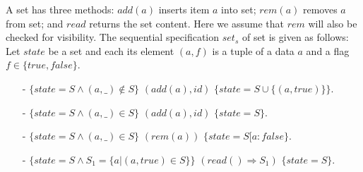 \begin{example}
\label{definition:sequential specification of set}
A set has three methods: $\mathit{add}(a)$ inserts item $a$ into set; $\mathit{rem}(a)$ removes $a$ from set; and $\mathit{read}$ returns the set content. %
Here we assume that $\mathit{rem}$ will also be checked for visibility.
The sequential specification $\mathit{set}_s$ of set is given as follows:  Let $\mathit{state}$ be a set and each its element $(a,f)$ is a tuple of a data $a$ and a flag $f \in \{ \mathit{true},\mathit{false} \}$.

\begin{itemize}
\setlength{\itemsep}{0.5pt}
\item[-] $\{ \mathit{state} = S \wedge (a,\_) \notin S \}$ $(\mathit{add}(a),\mathit{id})$ $\{ \mathit{state} = S \cup \{ (a,\mathit{true}) \} \}$.
\item[-] $\{ \mathit{state} = S \wedge (a,\_) \in S \}$ $(\mathit{add}(a),\mathit{id})$ $\{ \mathit{state} = S \}$.
\item[-] $\{ \mathit{state} = S \wedge (a,\_) \in S \}$ $(\mathit{rem}(a))$ $\{ \mathit{state} = S[a: \mathit{false} \}$.
\item[-] $\{ \mathit{state} = S \wedge S_1 = \{a \vert (a,\mathit{true}) \in S \} \}$ $(\mathit{read}() \Rightarrow S_1)$ $\{ \mathit{state} = S \}$.
\end{itemize}
\end{example}



